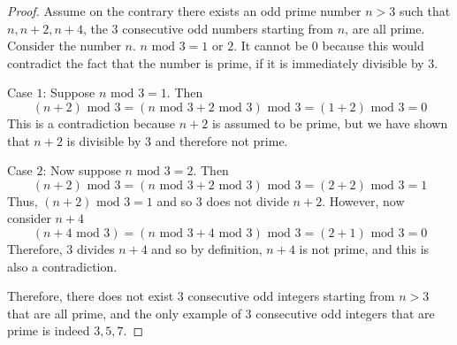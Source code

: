 \documentclass[12pt]{scrartcl}
\begin{document}
\begin{proof}
  Assume on the contrary there exists an odd prime number $n > 3$ such that 
  $n, n + 2, n + 4$, the $3$ consecutive odd numbers starting from $n$, are all prime. Consider the number $n$. $n \text{ mod } 3 = 1$ or $2$. 
  It cannot be $0$ because this would contradict the fact that the number is prime, if it is 
  immediately divisible by $3$. 
  
  \hfill

  Case $1$: Suppose $n \text{ mod } 3 = 1$. Then 
  \[(n+2) \text{ mod } 3 = (n \text{ mod } 3 + 2 \text { mod } 3) \text{ mod } 3 = (1 + 2) \text{ mod } 3 = 0\]
  This is a contradiction because $n + 2$ is assumed to be prime, but we have shown that $n + 2$ is divisible by $3$ and therefore not prime. 

  \hfill

  Case $2$: Now suppose $n \text{ mod } 3 = 2$. Then 
  \[(n + 2) \text{ mod } 3 = (n \text{ mod } 3 + 2 \text{ mod } 3) \text{ mod 3} = (2 + 2) \text{ mod } 3 = 1\]
  Thus, $(n + 2) \text{ mod } 3 = 1$ and so $3$ does not divide $n + 2$. However, now consider $n + 4$
  \[(n + 4 \text{ mod } 3) = (n \text { mod } 3 + 4 \text{ mod } 3) \text{ mod 3} = (2 + 1) \text{ mod } 3 = 0\]
  Therefore, $3$ divides $n + 4$ and so by definition, $n + 4$ is not prime, and this is also a contradiction.

  \hfill

  Therefore, there does not exist $3$ consecutive odd integers starting from $n > 3$ that are all prime, 
  and the only example of $3$ consecutive odd integers that are prime is indeed $3, 5, 7$. 
\end{proof}
\end{document}

